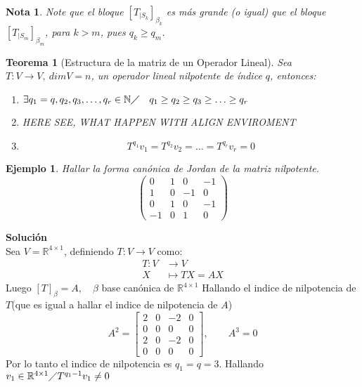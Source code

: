 \documentclass[10pt,a4paper]{article}
\newtheorem{mynote}{Nota}
\newtheorem{mytheo}{Teorema}
\newtheorem{myexamp}{Ejemplo}
\begin{document}
\begin{mynote}
Note que el bloque $\left[T_{|S_{k}}\right]_{\beta_{k}}$ es más grande (o igual) que el bloque $\left[T_{|S_{m}}\right]_{\beta_{m}}$, para $k > m$, pues $q_{k}\geq q_{m}$.

\end{mynote}


\begin{mytheo}[Estructura de la matriz de un Operador Lineal]
Sea $T:V\rightarrow V, \:dim V = n$, un operador lineal nilpotente de índice $q$, entonces:
\begin{enumerate}
	\item $\exists q_{1} = q, q_{2}, q_{3},\ldots, q_{r}\in\mathbb{N}\diagup\quad q_{1}\geq q_{2}\geq q_{3}\geq\ldots\geq q_{r}$
	\item HERE SEE, WHAT HAPPEN WITH ALIGN ENVIROMENT
	\item
	$$T^{q_{1}} v_{1} = T^{q_{2}}v_{2} = \ldots = T^{q_{r}}v_{r} = 0$$
\end{enumerate}
\end{mytheo}

\begin{myexamp}
	Hallar la forma canónica de Jordan de la matriz nilpotente.
	$$\begin{pmatrix}
		0	&	1	&	0	&	-1\\
		1	&	0	&	-1	&	0\\
		0	&	1	&	0	&	-1\\
		-1	&	0	&	1	&	0
	\end{pmatrix}$$
\end{myexamp}
\textbf{Solución}\\
Sea $V = \mathbb{R}^{4\times 1}$, definiendo $T:V\rightarrow V$ como:
\begin{align*}
	T: V &\rightarrow V\\
	X &\mapsto TX = AX
\end{align*}
Luego $[T]_{\beta} = A, \quad\beta$ base canónica de $\mathbb{R}^{4\times 1}$
Hallando el indice de nilpotencia de $T$(que es igual a hallar el indice de nilpotencia de $A$)
$$A^{2} = 
\begin{bmatrix}
2	&	0	&	-2	&	0\\
0	&	0	&	0	&	0\\
2	&	0	&	-2	&	0\\
0	&	0	&	0	&	0
\end{bmatrix},\qquad
A^{3} = 0
$$
Por lo tanto el indice de nilpotencia es $q_{1} = q = 3$.
Hallando $v_{1}\in\mathbb{R}^{4\times 1}\diagup T^{q_{1}-1}v_{1}\neq 0$
\end{document}
